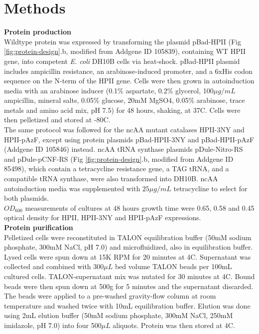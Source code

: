 \documentclass[journal=jacsat,manuscript=article]{achemso}
\begin{document}
\section{Methods}
\textbf{Protein production}\\
Wildtype protein was expressed by transforming the plasmid pBad-HPII (Fig \ref{fig:protein-design}.b, modified from Addgene ID 105839), containing WT HPII gene, into competent \textit{E. coli} DH10B cells via heat-shock. pBad-HPII plasmid includes ampicillin resistance, an arabinose-induced promoter, and a 6xHis codon sequence on the N-term of the HPII gene. Cells were then grown in autoinduction media with an arabinose inducer (0.1\% aspartate, 0.2\% glycerol, 100$\mu g / mL$ ampicillin, mineral salts, 0.05\% glucose, 20mM MgSO4, 0.05\% arabinose, trace metals and amino acid mix, pH 7.5) for 48 hours, shaking, at 37\degree C. Cells were then pelletized and stored at -80\degree C.\\

The same protocol was followed for the ncAA mutant catalases HPII-3NY and HPII-pAzF, except using protein plasmids pBad-HPII-3NY and pBad-HPII-pAzF (Addgene ID 105846) instead. ncAA tRNA synthase plasmids pDule-Nitro-RS and pDule-pCNF-RS (Fig \ref{fig:protein-design}.b, modified from Addgene ID 85498), which contain a tetracycline resistance gene, a TAG tRNA, and a compatible tRNA synthase, were also transformed into DH10B. ncAA autoinduction media was supplemented with $25\mu g / mL$ tetracycline to select for both plasmids.\\

$OD_{600}$ measurements of cultures at 48 hours growth time were 0.65, 0.58 and 0.45 optical density for HPII, HPII-3NY and HPII-pAzF expressions.\\

\textbf{Protein purification}\\
Pelletized cells were reconstituted in TALON equilibration buffer (50mM sodium phosphate, 300mM NaCl, pH 7.0) and microfluidized, also in equilibration buffer. Lysed cells were spun down at 15K RPM for 20 minutes at 4\degree C. Supernatant was collected and combined with 300$\mu L$ bed volume TALON beads per 100mL cultured cells. TALON-supernatant mix was nutated for 30 minutes at 4\degree C. Bound beads were then spun down at 500g for 5 minutes and the supernatant discarded. The beads were applied to a pre-washed gravity-flow column at room temperature and washed twice with 10mL equilibration buffer. Elution was done using 2mL elution buffer (50mM sodium phosphate, 300mM NaCl, 250mM imidazole, pH 7.0) into four 500$\mu L$ aliquots. Protein was then stored at 4\degree C.\\
\end{document}
